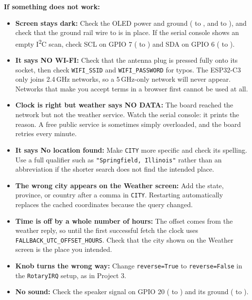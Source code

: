 \begin{tcolorbox}[colback=yellow!10!white,colframe=yellow!50!black]
    \textbf{If something does not work:}
    \begin{itemize}
        \item \textbf{Screen stays dark:} Check the OLED power and ground ( to
              , and  to ),
              and check that the ground rail wire  to  is in place.
              If the serial console shows an empty I\textsuperscript{2}C scan, check SCL on GPIO 7
              ( to ) and SDA on GPIO 6
              ( to ).
        \item \textbf{It says NO WI-FI:} Check that the antenna plug is pressed fully onto its socket, then
              check \texttt{WIFI\_SSID} and \texttt{WIFI\_PASSWORD} for typos. The
              ESP32-C3 only joins 2.4\,GHz networks, so a 5\,GHz-only network will never appear. Networks
              that make you accept terms in a browser first cannot be used at all.
        \item \textbf{Clock is right but weather says NO DATA:} The board reached the network but not the
              weather service. Watch the serial console: it prints the reason. A free public service is
              sometimes simply overloaded, and the board retries every minute.
        \item \textbf{It says No location found:} Make \texttt{CITY} more specific and check its spelling.
              Use a full qualifier such as \texttt{"Springfield, Illinois"} rather than an abbreviation
              if the shorter search does not find the intended place.
        \item \textbf{The wrong city appears on the Weather screen:} Add the state, province, or country
              after a comma in \texttt{CITY}. Restarting automatically replaces the cached coordinates
              because the query changed.
        \item \textbf{Time is off by a whole number of hours:} The offset comes from the weather reply, so
              until the first successful fetch the clock uses \texttt{FALLBACK\_UTC\_OFFSET\_HOURS}. Check
              that the city shown on the Weather screen is the place you intended.
        \item \textbf{Knob turns the wrong way:} Change \texttt{reverse=True} to \texttt{reverse=False} in the
              \texttt{RotaryIRQ} setup, as in Project 3.
        \item \textbf{No sound:} Check the speaker signal on GPIO 20 ( to
              ) and its ground ( to
              ).
    \end{itemize}
\end{tcolorbox}

